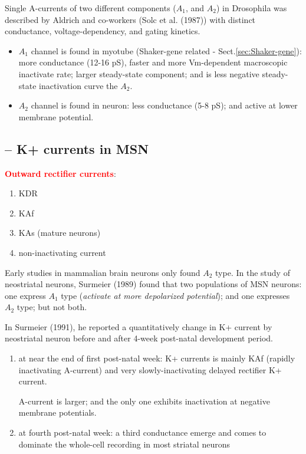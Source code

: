 Single A-currents of two different components ($A_1$, and $A_2$) in Drosophila
was described by Aldrich and co-workers (Solc et al. (1987)) with distinct
conductance, voltage-dependency, and gating kinetics.
\begin{itemize}
  
  \item $A_1$ channel is found in myotube (Shaker-gene related -
  Sect.\ref{sec:Shaker-gene}):
  more conductance (12-16 pS), faster and more Vm-dependent macroscopic
  inactivate rate; larger steady-state component; and is less negative
  steady-state inactivation curve the $A_2$.
  
  \item $A_2$ channel is found in neuron: less conductance (5-8 pS); and active
  at lower membrane potential.
\end{itemize}

\subsection{-- K+ currents in MSN}
\label{sec:MSN-K+-currents}

\textcolor{red}{\bf Outward rectifier currents}:
\begin{enumerate}
  \item KDR
  \item KAf
  \item KAs (mature neurons)
  \item non-inactivating current
\end{enumerate}

Early studies in mammalian brain neurons only found $A_2$ type. In the study of
neostriatal neurons, Surmeier (1989) found that two populations of MSN neurons:
one express $A_1$ type ({\it activate at more depolarized potential}); and one
expresses $A_2$ type; but not both.

In Surmeier (1991), he reported a quantitatively change in K+ current by
neostriatal neuron before and after 4-week post-natal development period.
\begin{enumerate}
  \item at near the end of first post-natal week: K+ currents is mainly KAf
  (rapidly inactivating A-current) and very slowly-inactivating delayed
  rectifier K+ current.
  
  A-current is larger; and the only one exhibits inactivation at negative
  membrane potentials.
  
  \item at fourth post-natal week: a third conductance emerge and comes to
  dominate the whole-cell recording in most striatal neurons
\end{enumerate}


